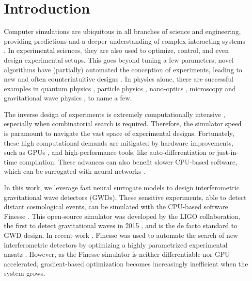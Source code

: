 \documentclass[a4paper,twocolumn,11pt,unpublished]{quantumarticle}
\begin{document}
\section{Introduction}

Computer simulations are ubiquitous in all branches of science and engineering, providing predictions and a deeper understanding of complex interacting systems \cite{metropolis1980history,
battimelli2020computer, dongarra2024co}. In experimental sciences, they are also used to optimize, control, and even design experimental setups. This goes beyond tuning a few parameters; novel algorithms have (partially) automated the conception of experiments, leading to new and often counterintuitive designs \cite{krenn2020computer}. In physics alone, there are successful examples in quantum physics \cite{krenn2016automated,knott2016search,o2019hybrid, melnikov2020setting,ruiz2023digital,maclellan2024end,lanore2024automated}, particle physics \cite{dorigo2023toward,rolla2023using,strong2024tomopt}, nano-optics \cite{molesky2018inverse,sapra2020chip,yang2023inverse}, microscopy \cite{nehme2020deepstorm3d,rodriguez2024automated} and gravitational wave physics \cite{krenn2023uifo}, to name a few.

The inverse design of experiments is extremely computationally intensive \cite{platt2018computational}, especially when combinatorial search is required. Therefore, the simulator speed is paramount to navigate the vast space of experimental designs. Fortunately, these high computational demands are mitigated by hardware improvements, such as GPUs \cite{dally2021evolution, silvano2025survey}, and high-performance tools, like auto-differentiation or just-in-time compilation. These advances can also benefit slower CPU-based software, which can be surrogated with neural networks \cite{asano2018optimization, ma2021deep, jiang2021deep, kudela2023deep, grady2023model, yin2023solving, peano2021rapid, schmidt2025endtoend}.

In this work, we leverage fast neural surrogate models to design interferometric gravitational wave detectors (GWDs). These sensitive experiments, able to detect distant cosmological events, can be simulated with the CPU-based software Finesse \cite{finesse}. This open-source simulator was developed by the LIGO collaboration, the first to detect gravitational waves in 2015 \cite{abbott2016observation}, and is the de facto standard to GWD design. In recent work  \cite{krenn2023uifo}, Finesse was used to automate the search of new interferometric detectors by optimizing a highly parametrized experimental ansatz \cite{krenn2023uifo}. However, as the Finesse simulator is neither differentiable nor GPU accelerated, gradient-based optimization becomes increasingly inefficient when the system grows.
\end{document}
